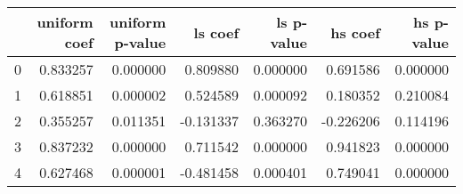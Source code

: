 \begin{tabular}{lrrrrrr}
\toprule
 & uniform coef & uniform p-value & ls coef & ls p-value & hs coef & hs p-value \\
\midrule
0 & 0.833257 & 0.000000 & 0.809880 & 0.000000 & 0.691586 & 0.000000 \\
1 & 0.618851 & 0.000002 & 0.524589 & 0.000092 & 0.180352 & 0.210084 \\
2 & 0.355257 & 0.011351 & -0.131337 & 0.363270 & -0.226206 & 0.114196 \\
3 & 0.837232 & 0.000000 & 0.711542 & 0.000000 & 0.941823 & 0.000000 \\
4 & 0.627468 & 0.000001 & -0.481458 & 0.000401 & 0.749041 & 0.000000 \\
\bottomrule
\end{tabular}
